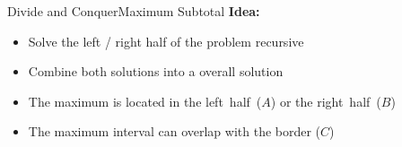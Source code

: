 


\begin{frame}{Divide and Conquer}{Maximum Subtotal}
  \textbf{Idea:}
  \begin{figure}
    \begin{adjustbox}{width=\linewidth}
      
    \end{adjustbox}
    \label{fig:divide_and_conquer:max_sub_total_divide}
  \end{figure}
  \vspace{-1.5em}
  \begin{itemize}
    \item<2->
      Solve the left / right half of the problem {\color{MainA}recursive}
    \item<3->
      Combine both solutions into a overall solution
    \item<4->
      The maximum is located in the {\color{MainA}left~half~($A$)}
      or the {\color{MainA}right~half~($B$)}
    \item<5->
      The maximum interval can {\color{MainA} overlap with the border ($C$)}
  \end{itemize}
\end{frame}

